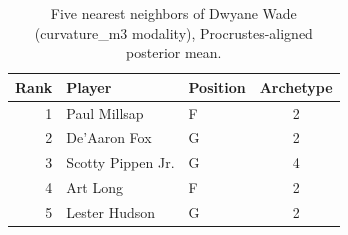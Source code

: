 \begin{table}[htbp]
  \centering\small
  \begin{tabular}{rllc}
    \toprule
    Rank & Player & Position & Archetype \\
    \midrule
    1 & Paul Millsap & F & 2 \\
    2 & De'Aaron Fox & G & 2 \\
    3 & Scotty Pippen Jr. & G & 4 \\
    4 & Art Long & F & 2 \\
    5 & Lester Hudson & G & 2 \\
    \bottomrule
  \end{tabular}
  \caption{Five nearest neighbors of Dwyane Wade (curvature_m3 modality), Procrustes-aligned posterior mean.}
  \label{tab:Dwyane_Wade_neighbors_curvature_m3}
\end{table}

